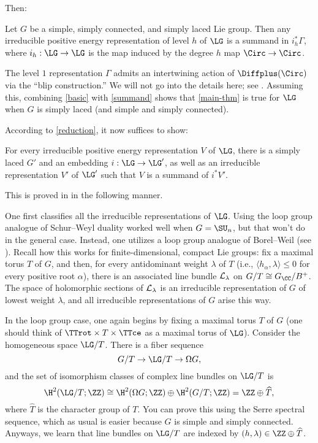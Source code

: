 Then:

\begin{prop}\label{basic}
	Let $G$ be a simple, simply connected, and simply laced Lie group. Then any
	irreducible positive energy representation of level $h$ of $\LG$ is a summand
	in $i_h^\ast \Gamma$, where $i_h:\LG\to \LG$ is the map induced by the degree
	$h$ map $\Circ\to \Circ$.
\end{prop}

The level $1$ representation $\Gamma$ admits an intertwining
action of $\Diffplus(\Circ)$ via the ``blip construction.''%
 We will not go into the details here; see \cite[\S 13.3]{loop}. Assuming
this, combining \cref{basic} with \cref{summand} shows that \cref{main-thm} is true for $\LG$ when $G$ is simply
laced (and simple and simply connected).

According to \cref{reduction}, it now suffices to show:
\begin{prop}\label{new-reduction}
	For every irreducible positive energy representation $V$ of $\LG$, there is a
	simply laced $G'$ and an embedding $i:\LG\to \LG'$, as well as an irreducible
	representation $V'$ of $\LG'$ such that $V$ is a summand of $i^\ast V'$. 
\end{prop}
This is proved in \cite[Lemma 13.4.4]{loop} in the following manner.

One first classifies all the irreducible representations of $\LG$. Using the loop
group analogue of Schur--Weyl duality worked well when $G = \SU_n$, but that
won't do in the general case. Instead, one utilizes a loop group analogue of
Borel--Weil (see \cite[Section 4.2]{segal-survey}). Recall how this works for finite-dimensional, compact Lie
groups: fix a maximal torus $T$ of $G$, and then, for every antidominant weight $\lambda$ of $T$ (i.e., $\langle
h_\alpha, \lambda\rangle \leq 0$ for every positive root $\alpha$), there is an associated line bundle
$\cal{L}_\lambda$ on $G/T \cong G_\CC/B^+$. The space of holomorphic sections of $\cal{L}_\lambda$ is an
irreducible representation of $G$ of lowest weight $\lambda$, and all irreducible representations of $G$ arise this
way.

In the loop group case, one again begins by fixing a maximal torus $T$ of $G$
(one should think of $\TTrot\times T \times \TTce$ as a maximal torus of
$\LG$). Consider the homogeneous space $\LG/T$. There is a fiber sequence
\begin{equation}
	G/T\to \LG/T \to \Omega G,
\end{equation}
and the set of isomorphism classes of complex line bundles on $\LG/T$ is
\begin{equation}
	\H^2(\LG/T;\ZZ) \cong \H^2(\Omega G;\ZZ) \oplus \H^2(G/T; \ZZ) = \ZZ \oplus
\widehat{T},
\end{equation}
where $\widehat{T}$ is the character group of $T$. You can prove this using the Serre spectral sequence, which as
usual is easier because $G$ is simple and simply connected. Anyways, we learn that line bundles on $\LG/T$ are
indexed by $(h,\lambda)\in \ZZ\oplus \widehat{T}$.

